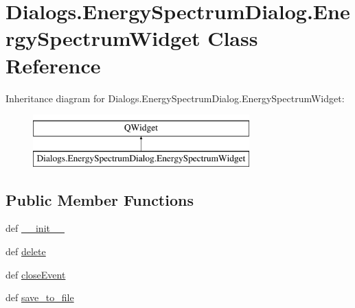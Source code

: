 \hypertarget{classDialogs_1_1EnergySpectrumDialog_1_1EnergySpectrumWidget}{\section{Dialogs.\-Energy\-Spectrum\-Dialog.\-Energy\-Spectrum\-Widget Class Reference}
\label{classDialogs_1_1EnergySpectrumDialog_1_1EnergySpectrumWidget}
}
Inheritance diagram for Dialogs.\-Energy\-Spectrum\-Dialog.\-Energy\-Spectrum\-Widget\-:\begin{figure}[H]
\begin{center}
\leavevmode
\includegraphics[height=2.000000cm]{classDialogs_1_1EnergySpectrumDialog_1_1EnergySpectrumWidget}
\end{center}
\end{figure}
\subsection*{Public Member Functions}
\begin{DoxyCompactItemize}
\item 
def \hyperlink{classDialogs_1_1EnergySpectrumDialog_1_1EnergySpectrumWidget_a1e0e0c3da1eebe63f9c197ec63be9436}{\-\_\-\-\_\-init\-\_\-\-\_\-}
\item 
def \hyperlink{classDialogs_1_1EnergySpectrumDialog_1_1EnergySpectrumWidget_a65c5bab24a8dc527f2cc996c62c62d16}{delete}
\item 
def \hyperlink{classDialogs_1_1EnergySpectrumDialog_1_1EnergySpectrumWidget_a94de0ccbae352dbd3808d5f183719b58}{close\-Event}
\item 
def \hyperlink{classDialogs_1_1EnergySpectrumDialog_1_1EnergySpectrumWidget_aee32bb81e69c7d5129d0d73a5137d8ee}{save\-\_\-to\-\_\-file}
\end{DoxyCompactItemize}
